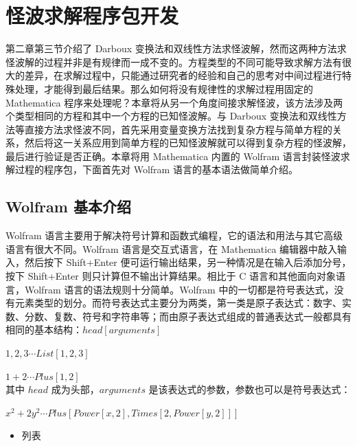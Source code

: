 
\chapter{怪波求解程序包开发}
第二章第三节介绍了 Darboux 变换法和双线性方法求怪波解，然而这两种方法求怪波解的过程并非是有规律而一成不变的。方程类型的不同可能导致求解方法有很大的差异，在求解过程中，只能通过研究者的经验和自己的思考对中间过程进行特殊处理，才能得到最后结果。那么如何将没有规律性的求解过程用固定的 Mathematica 程序来处理呢？本章将从另一个角度间接求解怪波，该方法涉及两个类型相同的方程和其中一个方程的已知怪波解。与 Darboux 变换法和双线性方法等直接方法求怪波不同，首先采用变量变换方法找到复杂方程与简单方程的关系，然后将这一关系应用到简单方程的已知怪波解就可以得到复杂方程的怪波解，最后进行验证是否正确。本章将用 Mathematica 内置的 Wolfram 语言封装怪波求解过程的程序包，下面首先对 Wolfram 语言的基本语法做简单介绍。

\section{Wolfram 基本介绍}
Wolfram 语言主要用于解决符号计算和函数式编程，它的语法和用法与其它高级语言有很大不同。Wolfram 语言是交互式语言，在 Mathematica 编辑器中敲入输入，然后按下 Shift+Enter 便可运行输出结果，另一种情况是在输入后添加分号，按下 Shift+Enter 则只计算但不输出计算结果。相比于 C 语言和其他面向对象语言，Wolfram 语言的语法规则十分简单。Wolfram 中的一切都是符号表达式，没有元素类型的划分。而符号表达式主要分为两类，第一类是原子表达式：数字、实数、分数、复数、符号和字符串等；而由原子表达式组成的普通表达式一般都具有相同的基本结构：$head[arguments]$

${1,2,3} \cdots List[1,2,3]$

$1+2 \cdots Plus[1,2]$\\
其中 $head$ 成为头部，$arguments$ 是该表达式的参数，参数也可以是符号表达式：

$x^2+2y^2 \cdots Plus[Power[x,2],Times[2,Power[y,2]]]$

\begin{itemize}
\item 列表
\end{itemize}

